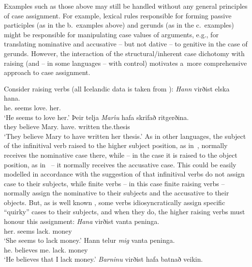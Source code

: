 \documentclass[output=paper
	        ,collection
	        ,collectionchapter
 	        ,biblatex
                ,babelshorthands
                ,newtxmath
                ,draftmode
                ,colorlinks, citecolor=brown
]{./langsci/langscibook}
\begin{document}
Examples such as those above may still be handled without any general principles of case assignment.  For example, lexical rules \citep[209–218]{ps} responsible for forming passive participles (as in the b.~examples above) and gerunds (as in the c.~examples) might be responsible for manipulating case values of arguments, e.g., for translating nominative and accusative – but not dative – to genitive in the case of gerunds.  However, the interaction of the structural/inherent case dichotomy with raising (and – in some languages – with control) motivates a~more comprehensive approach to case assignment.

Consider  raising verbs (all Icelandic data is taken from \citealt[304–305]{SKG92}):
\eal
\label{isl:nom}
\ex
\gll \emph{Hann} virðist elska hana. \\
     he.\NOM{} seems love.\INF{} her.\ACC{}\\
\glt `He seems to love her.'
\ex
\gll Þeir telja \emph{Mar{\'\i}u} hafa skrifað ritgerðina. \\
     they believe Mary.\ACC{} have.\INF{} written the.thesis\\
\glt `They believe Mary to have written her thesis.'
\zl
As in other languages, the subject of the infinitival verb raised to the higher subject position, as in~, normally receives the nominative case there, while – in the case it is raised to the object position, as in~ – it normally receives the accusative case.  This could be easily modelled in accordance with the suggestion of \citet[30]{ps2} that infinitival verbs do not assign case to their subjects, while finite verbs – in this case finite raising verbs – normally assign the nominative to their subjects and the accusative to their objects.  But, as is well known \citep{Andrews82a-u-kopiert,zae:mal:83,ZMT85a}, some  verbs idiosyncratically assign specific “quirky” cases to their subjects, and when they do, the higher raising verbs must honour this assignment:
\eal\label{isl:acc}
\ex
\gll \emph{Hana} virðist vanta peninga. \\
      her.\ACC{} seems lack.\INF{} money\\
\glt `She seems to lack money.'
\ex
\gll Hann telur \emph{mig} vanta peninga. \\
      he.\NOM{} believes me.\ACC{} lack.\INF{} money\\
\glt `He believes that I lack money.'
\zl
\eal
\label{isl:dat}
\ex
\gll  \emph{Barninu} virðist hafa batnað veikin. \\
\end{document}
